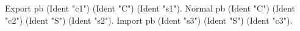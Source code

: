 Export pb (Ident "c1") (Ident "C") (Ident "s1").
Normal pb (Ident "C") (Ident "c2") (Ident "S") (Ident "s2").
Import pb (Ident "s3") (Ident "S") (Ident "c3").